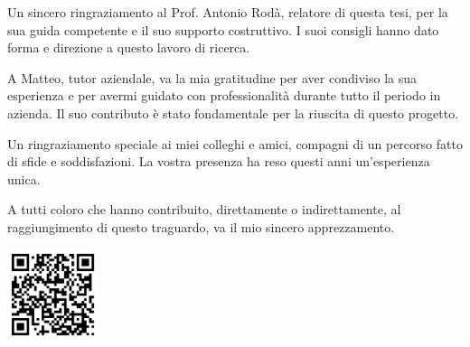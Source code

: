 
%

\begin{ntacknowledgements}

    Un sincero ringraziamento al Prof. Antonio Rodà, relatore di questa tesi, per la sua guida competente e il suo supporto costruttivo. I suoi consigli hanno dato forma e direzione a questo lavoro di ricerca.

    A Matteo, tutor aziendale, va la mia gratitudine per aver condiviso la sua esperienza e per avermi guidato con professionalità durante tutto il periodo in azienda. Il suo contributo è stato fondamentale per la riuscita di questo progetto.

    Un ringraziamento speciale ai miei colleghi e amici, compagni di un percorso fatto di sfide e soddisfazioni. La vostra presenza ha reso questi anni un'esperienza unica.

    A tutti coloro che hanno contribuito, direttamente o indirettamente, al raggiungimento di questo traguardo, va il mio sincero apprezzamento.

\end{ntacknowledgements}

\vspace{2em}
\begin{center}
    \includegraphics[width=0.2\textwidth]{Chapters/Figures/thank_me.png} 
\end{center}